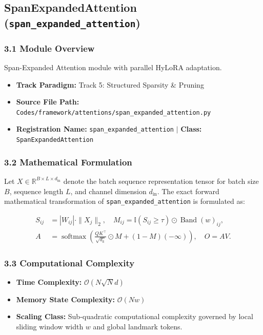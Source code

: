 \subsection{SpanExpandedAttention (\texttt{span\_expanded\_attention})}
\label{sec:app_module_span_expanded_attention}

\subsubsection*{3.1 Module Overview}
Span-Expanded Attention module with parallel HyLoRA adaptation.
\begin{itemize}
    \item \textbf{Track Paradigm:} Track 5: Structured Sparsity \& Pruning
    \item \textbf{Source File Path:} \texttt{Codes/framework/attentions/span\_expanded\_attention.py}
    \item \textbf{Registration Name:} \texttt{span\_expanded\_attention} $\mid$ \textbf{Class:} \texttt{SpanExpandedAttention}
\end{itemize}

\subsubsection*{3.2 Mathematical Formulation}
Let $X \in \mathbb{R}^{B \times L \times d_{\text{in}}}$ denote the batch sequence representation tensor for batch size $B$, sequence length $L$, and channel dimension $d_{\text{in}}$. The exact forward mathematical transformation of \texttt{span\_expanded\_attention} is formulated as:

\begin{align}
S_{ij} &= |W_{ij}| \cdot \|X_j\|_2, \quad M_{ij} = \mathbb{I}(S_{ij} \ge \tau) \odot \operatorname{Band}(w)_{ij}, \\
A &= \operatorname{softmax}\left(\frac{Q K^\top}{\sqrt{d_k}} \odot M + (1 - M)(-\infty)\right), \quad O = A V.
\end{align}


\subsubsection*{3.3 Computational Complexity}
\begin{itemize}
    \item \textbf{Time Complexity:} $\mathcal{O}(N \sqrt{N} d)$
    \item \textbf{Memory State Complexity:} $\mathcal{O}(N w)$
    \item \textbf{Scaling Class:} Sub-quadratic computational complexity governed by local sliding window width $w$ and global landmark tokens.
\end{itemize}

